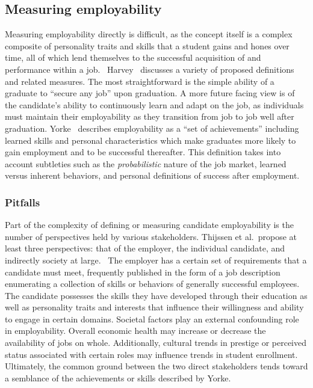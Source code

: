 \subsection{Measuring employability}

Measuring employability directly is difficult, as the concept itself is a complex composite of personality traits and skills that a student gains and hones over time, all of which lend themselves to the successful acquisition of and performance within a job.~\cite{harvey2000,yorke2006,williams2016}
Harvey~\cite{harvey2001} discusses a variety of proposed definitions and related measures.
The most straightforward is the simple ability of a graduate to ``secure any job'' upon graduation.
A more future facing view is of the candidate's ability to continuously learn and adapt on the job, as individuals must maintain their employability as they transition from job to job well after graduation.
Yorke~\cite{yorke2006} describes employability as a ``set of achievements'' including learned skills and personal characteristics which make graduates more likely to gain employment and to be successful thereafter.
This definition takes into account subtleties such as the \textit{probabilistic} nature of the job market, learned versus inherent behaviors, and personal definitions of success after employment.

\subsubsection{Pitfalls}

Part of the complexity of defining or measuring candidate employability is the number of perspectives held by various stakeholders.
Thijssen et al.\ propose at least three perspectives: that of the employer, the individual candidate, and indirectly society at large.~\cite{thijssen2008}
The employer has a certain set of requirements that a candidate must meet, frequently published in the form of a job description enumerating a collection of skills or behaviors of generally successful employees.
The candidate possesses the skills they have developed through their education as well as personality traits and interests that influence their willingness and ability to engage in certain domains.
Societal factors play an external confounding role in employability.
Overall economic health may increase or decrease the availability of jobs on whole.
Additionally, cultural trends in prestige or perceived status associated with certain roles may influence trends in student enrollment.
Ultimately, the common ground between the two direct stakeholders tends toward a semblance of the achievements or skills described by Yorke.

